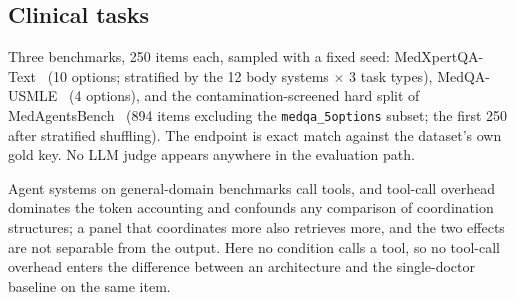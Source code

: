 \subsection{Clinical tasks}

Three benchmarks, 250 items each, sampled with a fixed seed:
MedXpertQA-Text~\citep{zuo2025medxpertqa} (10 options; stratified by the 12 body systems $\times$
3 task types), MedQA-USMLE~\citep{jin2021medqa} (4 options), and the contamination-screened hard
split of MedAgentsBench~\citep{medagentsbench} (894 items excluding the
\texttt{medqa\_5options} subset; the first 250 after stratified shuffling). The endpoint is exact
match against the dataset's own gold key. No LLM judge appears anywhere in the evaluation path.

Agent systems on
general-domain benchmarks call tools, and tool-call overhead dominates the token accounting and
confounds any comparison of coordination structures; a panel that coordinates more also retrieves
more, and the two effects are not separable from the output. Here no condition calls a tool, so
no tool-call overhead enters the difference between an architecture and the single-doctor
baseline on the same item.
